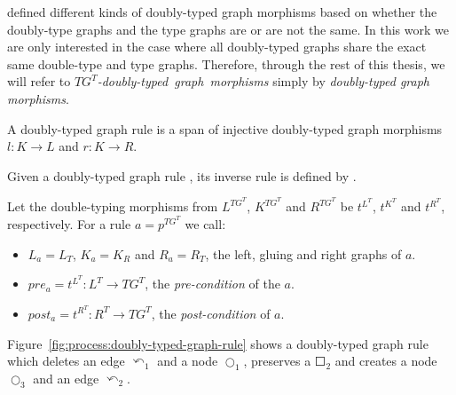 \begin{remark} \cite{Ribeiro1996} defined different kinds of doubly-typed graph morphisms based on whether the doubly-type graphs and the type graphs are or are not the same. In this work we are only interested in the case where all doubly-typed graphs share the exact same double-type and type graphs. Therefore, through the rest of this thesis, we will refer to \mbox{\emph{$TG^T$-doubly-typed graph morphisms}} simply by \emph{doubly-typed graph morphisms}.
\end{remark}


\begin{definition} A doubly-typed graph rule \doublyTypedRule{} is a span of injective doubly-typed graph morphisms $l : K \rightarrow L$ and $r : K \rightarrow R$.


  Given a doubly-typed graph rule \doublyTypedRule{}, its inverse rule is defined by \inverseDoublyTypedRule{}.

  Let the double-typing morphisms from $L^{TG^T}$, $K^{TG^T}$ and $R^{TG^T}$ be $t^{L^T}$, $t^{K^T}$ and $t^{R^T}$, respectively. For a rule $a = p^{TG^T}$ we call:

  \begin{itemize}
    \item $L_a = L_T$, $K_a = K_R$ and $R_a = R_T$, the left, gluing and right graphs of $a$.
    \item $pre_a = t^{L^T} : L^T \rightarrow TG^T$, the \emph{pre-condition} of the $a$.
    \item $post_a = t^{R^T} : R^T \rightarrow TG^T$, the \emph{post-condition} of $a$.
  \end{itemize}
\end{definition}

\begin{example}Figure~\ref{fig:process:doubly-typed-graph-rule} shows a doubly-typed graph rule which deletes an edge $\curvearrowleft_1$ and a node $\Circle_1$, preserves a $\Square_2$ and creates a node $\Circle_3$ and an edge $\curvearrowleft_2$.
\end{example}

